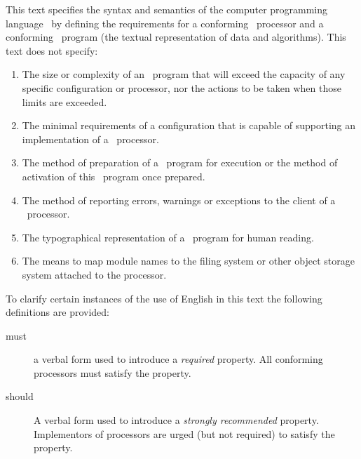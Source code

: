\begin{optDefinition}
This text specifies the syntax and semantics of the computer
programming language \eulisp\ by defining the requirements for a
conforming \eulisp\ processor and a conforming \eulisp\ program (the
textual representation of data and algorithms).
%
%
\noindent
This text does not specify:
\begin{enumerate}
    \item The size or complexity of an \eulisp\ program that will exceed the
    capacity of any specific configuration or processor, nor the actions to be
    taken when those limits are exceeded.
    \item The minimal requirements of a configuration that is capable of
    supporting an implementation of a \eulisp\ processor.
    \item The method of preparation of a \eulisp\ program for execution or the
    method of activation of this \eulisp\ program once prepared.
    \item The method of reporting errors, warnings or exceptions to the client
    of a \eulisp\ processor.
    \item The typographical representation of a \eulisp\ program for human
    reading.
    \item The means to map module names to the filing system or other object
    storage system attached to the processor.
\end{enumerate}
%
To clarify certain instances of the use of English in this text the following
definitions are provided:
\begin{description}
    \item[must] a verbal form used to introduce a {\em required} property.  All
    conforming processors must satisfy the property.
    \item[should] A verbal form used to introduce a {\em strongly recommended}
    property.  Implementors of processors are urged (but not required) to
    satisfy the property.
\end{description}
\end{optDefinition}
